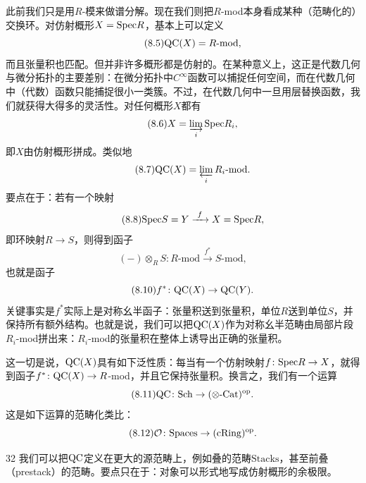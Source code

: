 此前我们只是用$R$-模来做谱分解。现在我们则把$R$-mod本身看成某种（范畴化的）交换环。对仿射概形$X=\mathrm{Spec} R$，基本上可以定义
\begin{equation}\tag{8.5}
\mathrm{QC}(X)=R\text{-mod},
\end{equation}
而且张量积也匹配。但并非许多概形都是仿射的。在某种意义上，这正是代数几何与微分拓扑的主要差别：在微分拓扑中$C^{\infty}$函数可以捕捉任何空间，而在代数几何中（代数）函数只能捕捉很小一类簇。不过，在代数几何中一旦用层替换函数，我们就获得大得多的灵活性。对任何概形$X$都有
\begin{equation}\tag{8.6}
X=\varinjlim_{i}\mathrm{Spec} R_{i},
\end{equation}
即$X$由仿射概形拼成。类似地
\begin{equation}\tag{8.7}
\mathrm{QC}(X)=\varprojlim_{i}R_{i}\text{-mod}.
\end{equation}
要点在于：若有一个映射
\begin{equation}\tag{8.8}
\mathrm{Spec} S=Y\xrightarrow{\ f\ }X=\mathrm{Spec} R,
\end{equation}
即环映射$R\to S$，则得到函子
\begin{equation}\tag{8.9}
(-)\otimes_{R}S\colon R\text{-mod}\xrightarrow{\ f^{*}\ }S\text{-mod},
\end{equation}
也就是函子
\begin{equation}\tag{8.10}
f^{*}\colon \mathrm{QC}(X)\to\mathrm{QC}(Y).
\end{equation}
关键事实是$f^{*}$实际上是对称幺半函子：张量积送到张量积，单位$R$送到单位$S$，并保持所有额外结构。也就是说，我们可以把$\mathrm{QC}(X)$作为对称幺半范畴由局部片段$R_i$-mod拼出来：$R_i$-mod的张量积在整体上诱导出正确的张量积。

这一切是说，$\mathrm{QC}(X)$具有如下泛性质：每当有一个仿射映射$f\colon\mathrm{Spec} R\to X$，就得到函子$f^{*}\colon\mathrm{QC}(X)\to R$-mod，并且它保持张量积。换言之，我们有一个运算
\begin{equation}\tag{8.11}
\mathrm{QC}\colon\mathrm{Sch}\to(\otimes\text{-}\mathrm{Cat})^{\mathrm{op}}.
\end{equation}
这是如下运算的范畴化类比：
\begin{equation}\tag{8.12}
\mathcal{O}\colon\mathrm{Spaces}\to(\mathrm{cRing})^{\mathrm{op}}.
\end{equation}

\begin{srcrem}{32}
我们可以把$\mathrm{QC}$定义在更大的源范畴上，例如叠的范畴$\mathrm{Stacks}$，甚至前叠（prestack）的范畴。要点只在于：对象可以形式地写成仿射概形的余极限。
\end{srcrem}

